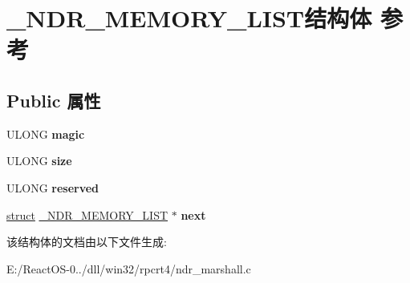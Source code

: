 \hypertarget{struct___n_d_r___m_e_m_o_r_y___l_i_s_t}{}\section{\+\_\+\+N\+D\+R\+\_\+\+M\+E\+M\+O\+R\+Y\+\_\+\+L\+I\+S\+T结构体 参考}
\label{struct___n_d_r___m_e_m_o_r_y___l_i_s_t}
\subsection*{Public 属性}
\begin{DoxyCompactItemize}
\item 
\mbox{\label{struct___n_d_r___m_e_m_o_r_y___l_i_s_t_a52873721a85722269ebfbdadfb32c0a5}} 
U\+L\+O\+NG {\bfseries magic}
\item 
\mbox{\label{struct___n_d_r___m_e_m_o_r_y___l_i_s_t_aa0b132adc1489c4f00d0d12ff0d81c85}} 
U\+L\+O\+NG {\bfseries size}
\item 
\mbox{\label{struct___n_d_r___m_e_m_o_r_y___l_i_s_t_ac87ff266f5bed0b4119c06f644dc7ec2}} 
U\+L\+O\+NG {\bfseries reserved}
\item 
\mbox{\label{struct___n_d_r___m_e_m_o_r_y___l_i_s_t_a141668e10aa94df1e12a0b5f04764db1}} 
\hyperlink{interfacestruct}{struct} \hyperlink{struct___n_d_r___m_e_m_o_r_y___l_i_s_t}{\+\_\+\+N\+D\+R\+\_\+\+M\+E\+M\+O\+R\+Y\+\_\+\+L\+I\+ST} $\ast$ {\bfseries next}
\end{DoxyCompactItemize}


该结构体的文档由以下文件生成\+:\begin{DoxyCompactItemize}
\item 
E\+:/\+React\+O\+S-\/0../dll/win32/rpcrt4/ndr\+\_\+marshall.\+c\end{DoxyCompactItemize}
